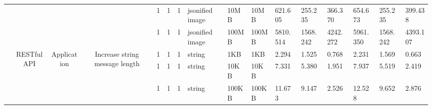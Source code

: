 \begin{landscape}
\begin{table}[]
{\begin{tabular}{@{}ccccllllllllllll@{}}
                                                &                              &                               &                                                 & 1                                        & 1                                          & 1                                 & jsonified image                  & 10MB                                          & 10MB                                            & 621.605                 & 255.235  & 366.370                      & 654.673                 & 255.235  & 399.438                      \\
                                                &                              &                               &                                                 & 1                                        & 1                                          & 1                                 & jsonified image                  & 100MB                                         & 100MB                                           & 5810.514                & 1568.242 & 4242.272                     & 5961.350                & 1568.242 & 4393.107                     \\
                                                & \multirow{5}{*}{RESTful API} & \multirow{5}{*}{Application}  & \multirow{5}{*}{Increase string message length} & 1                                        & 1                                          & 1                                 & string                           & 1KB                                           & 1KB                                             & 2.294                   & 1.525    & 0.768                        & 2.231                   & 1.569    & 0.663                        \\
                                                &                              &                               &                                                 & 1                                        & 1                                          & 1                                 & string                           & 10KB                                          & 10KB                                            & 7.331                   & 5.380    & 1.951                        & 7.937                   & 5.519    & 2.419                        \\
                                                &                              &                               &                                                 & 1                                        & 1                                          & 1                                 & string                           & 100KB                                         & 100KB                                           & 11.673                  & 9.147    & 2.526                        & 12.528                  & 9.652    & 2.876                        \\

\end{tabular}}
\end{table}
\end{landscape}
